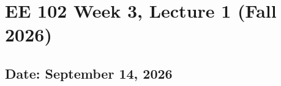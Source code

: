 \documentclass{ee102_notes}
\renewcommand{\releasedate}{September 14, 2026}
\begin{document}
\section*{EE 102 Week 3, Lecture 1 (Fall 2026)}
\subsection*{Date: \releasedate}
\tableofcontents

\end{document}
